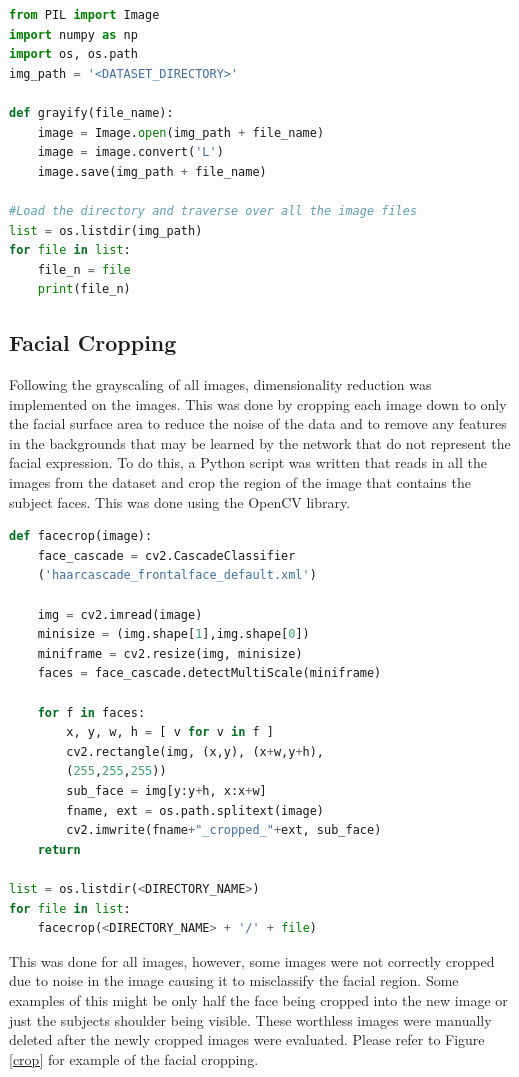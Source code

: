 \begin{lstlisting}[language=Python, frame=single]
from PIL import Image
import numpy as np
import os, os.path
img_path = '<DATASET_DIRECTORY>' 

def grayify(file_name):
	image = Image.open(img_path + file_name)
	image = image.convert('L')
	image.save(img_path + file_name)

#Load the directory and traverse over all the image files
list = os.listdir(img_path)
for file in list:
	file_n = file
	print(file_n)

\end{lstlisting}

\subsection{Facial Cropping}
Following the grayscaling of all images, dimensionality reduction was implemented on the images. This was done by cropping each image down to only the facial surface area to reduce the noise of the data and to remove any features in the backgrounds that may be learned by the network that do not represent the facial expression. To do this, a Python script was written that reads in all the images from the dataset and crop the region of the image that contains the subject faces. This was done using the OpenCV library.

\begin{lstlisting}[language=Python, frame=single]
def facecrop(image):
	face_cascade = cv2.CascadeClassifier
	('haarcascade_frontalface_default.xml')
	
	img = cv2.imread(image)
	minisize = (img.shape[1],img.shape[0])
	miniframe = cv2.resize(img, minisize)
	faces = face_cascade.detectMultiScale(miniframe)
	
	for f in faces:
		x, y, w, h = [ v for v in f ]
		cv2.rectangle(img, (x,y), (x+w,y+h),
		(255,255,255))
		sub_face = img[y:y+h, x:x+w]
		fname, ext = os.path.splitext(image)
		cv2.imwrite(fname+"_cropped_"+ext, sub_face)
	return

list = os.listdir(<DIRECTORY_NAME>)
for file in list:
	facecrop(<DIRECTORY_NAME> + '/' + file)
\end{lstlisting}
\newpage
This was done for all images, however, some images were not correctly cropped due to noise in the image causing it to misclassify the facial region. Some examples of this might be only half the face being cropped into the new image or just the subjects shoulder being visible. These worthless images were manually deleted after the newly cropped images were evaluated. Please refer to Figure \ref{crop} for example of the facial cropping.

